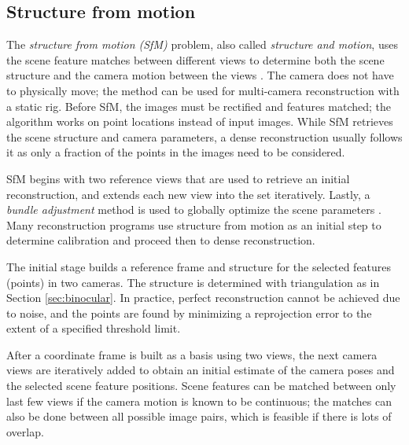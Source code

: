 
\subsection{Structure from motion} \label{sec:sfm} %


The \emph{structure from motion (SfM)} problem, also called \emph{structure and motion}, uses the scene feature matches between different views to determine both the scene structure and the camera motion between the views \cite{snavely2006photo,fitzgibbon1998automatic,pollefeys2004visual}.
The camera does not have to physically move; the method can be used for multi-camera reconstruction with a static rig.
Before SfM, the images must be rectified and features matched; the algorithm works on point locations instead of input images.
While SfM retrieves the scene structure and camera parameters, a dense reconstruction usually follows it as only a fraction of the points in the images need to be considered. \cite{pollefeys2004visual}

SfM begins with two reference views that are used to retrieve an initial reconstruction, and extends each new view into the set iteratively.
Lastly, a \emph{bundle adjustment} method is used to globally optimize the scene parameters \cite{triggs2000bundle}.
Many reconstruction programs use structure from motion as an initial step to determine calibration and proceed then to dense reconstruction.

The initial stage builds a reference frame and structure for the selected features (points) in two cameras.
The structure is determined with triangulation as in Section \ref{sec:binocular}.
In practice, perfect reconstruction cannot be achieved due to noise, and the points are found by minimizing a reprojection error to the extent of a specified threshold limit.

After a coordinate frame is built as a basis using two views, the next camera views are iteratively added to obtain an initial estimate of the camera poses and the selected scene feature positions.
Scene features can be matched between only last few views if the camera motion is known to be continuous;
the matches can also be done between all possible image pairs, which is feasible if there is lots of overlap.

